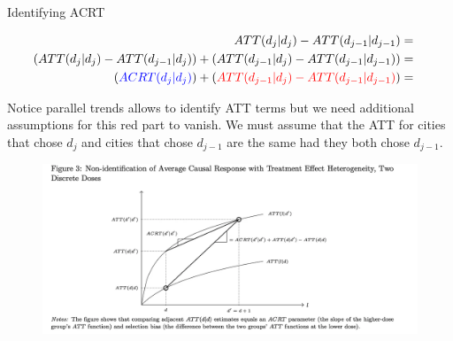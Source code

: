 \documentclass{beamer}
\begin{document}
\begin{frame}{Identifying ACRT}


\begin{eqnarray*}
ATT(d_j|d_j) - ATT(d_{j-1} | d_{j-1}) &=& \\
( ATT(d_j|d_j) - ATT(d_{j-1} | d_{j}) ) + ( ATT(d_{j-1} | d_j) - ATT(d_{j-1} | d_{j-1}) )&=&  \\
 ( \textcolor{blue}{ACRT(d_j | d_j)} ) + ( \textcolor{red}{ATT(d_{j-1} | d_j) - ATT(d_{j-1} | d_{j-1})} )&=&  \\
\end{eqnarray*}

Notice parallel trends allows to identify ATT terms but we need additional assumptions for this red part to vanish. We must assume that the ATT for cities that chose $d_j$ and cities that chose $d_{j-1}$ are the same had they both chose $d_{j-1}$.

\end{frame}

\begin{frame}


\begin{figure}
\begin{center}
             \includegraphics[scale=0.45]{./lecture_includes/continuous5.png}
\end{center}
\end{figure}

\end{frame}
\end{document}
